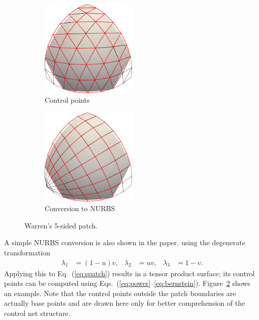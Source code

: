 \documentclass[9pt,academicons]{article}
\begin{document}
\begin{figure}
  \begin{subfigure}{0.49\textwidth}
    \centering
    \includegraphics[width = 0.5\textwidth]{images/warren-cnet.png}
    \caption{Control points}
    \label{fig:warren-cnet}
  \end{subfigure}
  \hfill
  \begin{subfigure}{0.49\textwidth}
    \centering
    \includegraphics[width = 0.5\textwidth]{images/warren-quad.png}
    \caption{Conversion to NURBS}
    \label{fig:warren-quad}
  \end{subfigure}
  \caption{Warren's 5-sided patch.}
  \label{fig:warren}
\end{figure}
A simple NURBS conversion is also shown in the paper,
using the degenerate transformation
\begin{align}
  \lambda_1&=(1-u)v, & \lambda_2&=uv, & \lambda_3&=1-v.
\end{align}
Applying this to Eq.~(\ref{eq:spatch}) results in a tensor product surface; its control points
can be computed using Eqs.~(\ref{eq:power}--\ref{eq:bernstein}).
Figure~\ref{fig:warren-quad} shows an example. Note that the control points outside the
patch boundaries are actually base points and are drawn here only for better comprehension
of the control net structure.
\end{document}
